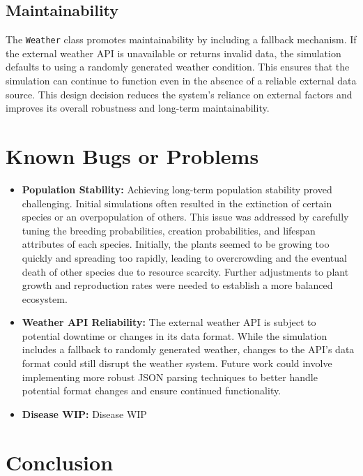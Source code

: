 \documentclass{article}
\begin{document}
\subsection{Maintainability}

The \texttt{Weather} class promotes maintainability by including a fallback mechanism. If the external weather API is unavailable or returns invalid data, the simulation defaults to using a randomly generated weather condition. This ensures that the simulation can continue to function even in the absence of a reliable external data source. This design decision reduces the system's reliance on external factors and improves its overall robustness and long-term maintainability.

\section{Known Bugs or Problems}

\begin{itemize}
    \item \textbf{Population Stability:} Achieving long-term population stability proved challenging. Initial simulations often resulted in the extinction of certain species or an overpopulation of others. This issue was addressed by carefully tuning the breeding probabilities, creation probabilities, and lifespan attributes of each species. Initially, the plants seemed to be growing too quickly and spreading too rapidly, leading to overcrowding and the eventual death of other species due to resource scarcity. Further adjustments to plant growth and reproduction rates were needed to establish a more balanced ecosystem.
    \item \textbf{Weather API Reliability:} The external weather API is subject to potential downtime or changes in its data format. While the simulation includes a fallback to randomly generated weather, changes to the API's data format could still disrupt the weather system. Future work could involve implementing more robust JSON parsing techniques to better handle potential format changes and ensure continued functionality.
    \item \textbf{Disease WIP:} Disease WIP
\end{itemize}

\section{Conclusion}
\end{document}
